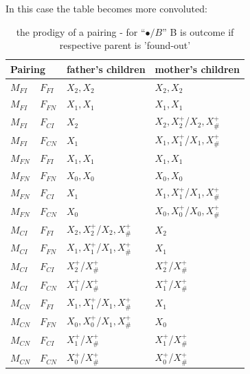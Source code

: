 \documentclass[journal,article,accept,oneauthors,pdftex,10pt,a4paper]{mdpi}
\begin{document}
In this case the table becomes more convoluted:
\begin{table}[H]
    \centering
    \begin{tabular}{|ll|l|l|}
        \hline
        \multicolumn{2}{|l|}{Pairing} & father's children & mother's children \\
        \hline
        $M_{FI}$ & $F_{FI}$ & $X_2,X_2$ & $X_2,X_2$ \\
        $M_{FI}$ & $F_{FN}$ & $X_1,X_1$ & $X_1,X_1$ \\
        $M_{FI}$ & $F_{CI}$ & $X_2$ & $X_2,X^+_2$\slash$X_2,X^+_\#$ \\
        $M_{FI}$ & $F_{CN}$ & $X_1$ & $X_1,X^+_1$\slash$X_1,X^+_\#$ \\
        \hline
        $M_{FN}$ & $F_{FI}$ & $X_1,X_1$ & $X_1,X_1$ \\
        $M_{FN}$ & $F_{FN}$ & $X_0,X_0$ & $X_0,X_0$ \\
        $M_{FN}$ & $F_{CI}$ & $X_1$ & $X_1,X^+_1$\slash$X_1,X^+_\#$ \\
        $M_{FN}$ & $F_{CN}$ & $X_0$ & $X_0,X^+_0$\slash$X_0,X^+_\#$ \\
        \hline
        $M_{CI}$ & $F_{FI}$ & $X_2,X^+_2$\slash$X_2,X^+_\#$ & $X_2$ \\
        $M_{CI}$ & $F_{FN}$ & $X_1,X^+_1$\slash$X_1,X^+_\#$ & $X_1$ \\
        $M_{CI}$ & $F_{CI}$ & $X^+_2$\slash$X^+_\#$ & $X^+_2$\slash$X^+_\#$ \\
        $M_{CI}$ & $F_{CN}$ & $X^+_1$\slash$X^+_\#$ & $X^+_1$\slash$X^+_\#$ \\
        \hline
        $M_{CN}$ & $F_{FI}$ & $X_1,X^+_1$\slash$X_1,X^+_\#$ & $X_1$ \\
        $M_{CN}$ & $F_{FN}$ & $X_0,X^+_0$\slash$X_1,X^+_\#$ & $X_0$ \\
        $M_{CN}$ & $F_{CI}$ & $X^+_1$\slash$X^+_\#$ & $X^+_1$\slash$X^+_\#$ \\
        $M_{CN}$ & $F_{CN}$ & $X^+_0$\slash$X^+_\#$ & $X^+_0$\slash$X^+_\#$ \\
        \hline
    \end{tabular}
    \caption{the prodigy of a pairing - for ``$\bullet \slash B$'' B is outcome if respective parent is 'found-out'}\label{table:outcomes}
\end{table}
\end{document}
